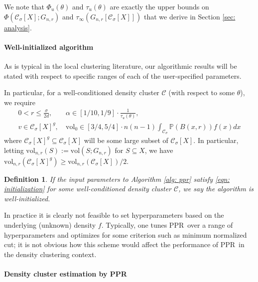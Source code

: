 \documentclass{article}
\newcommand{\vol}{\mathrm{vol}}
\newcommand{\1}{\mathbf{1}}
\newcommand{\Phibf}{\Phi_{u}}
\newcommand{\taubf}{\tau_{u}}
\newcommand{\Xbf}{X}             %
\newcommand{\Pbb}{\mathbb{P}}
\newcommand{\Cset}{\mathcal{C}}
\newcommand{\Csig}{\Cset_{\sigma}}
\newcommand{\ppr}{{\sc PPR}}
\newcommand{\pprspace}{{\sc PPR~}}
\theoremstyle{aldenthm}
\newtheorem{definition}{Definition}
\theoremstyle{aldenrmrk}
\begin{document}
We note that $\Phibf(\theta)$ and $\taubf(\theta)$ are exactly the upper bounds on $\Phi(\Csig[\Xbf]; G_{n,r})$ and $\tau_{\infty}(G_{n,r}[\Csig[\Xbf]])$ that we derive in Section \ref{sec: analysis}.

\paragraph{Well-initialized algorithm}

As is typical in the local clustering literature, our algorithmic results will be stated with respect to specific ranges of each of the user-specified parameters.

In particular, for a well-conditioned density cluster $\Cset$ (with respect to some $\theta$), we require
\begin{align}
\label{eqn: initialization}
0 < r \leq \frac{\sigma}{2d}, & ~\alpha \in [1/10, 1/9] \cdot \frac{1}{\taubf(\theta)} \nonumber,  \\
v \in \Csig[\Xbf]^g, & ~\vol_0 \in [3/4,5/4] \cdot n(n-1) \int_{\Csig} \Pbb(B(x,r)) f(x) dx
\end{align}
where $\Csig[\Xbf]^g \subseteq \Csig[\Xbf]$ will be some large subset of $\Csig[\Xbf]$. In particular, letting $\vol_{n,r}(S) := \vol(S; G_{n,r})$ for $S \subseteq \Xbf$, we have $\vol_{n,r}(\Csig[\Xbf]^g) \geq \vol_{n,r}(\Csig[\Xbf])/2$.

\begin{definition}
	If the input parameters to Algorithm \ref{alg: ppr} satisfy \eqref{eqn: initialization} for some well-conditioned density cluster $\Cset$, we say the algorithm is \emph{well-initialized}.
\end{definition}

In practice it is clearly not feasible to set hyperparameters based on the underlying (unknown) density $f$. Typically, one tunes \pprspace over a range of hyperparameters and optimizes for some criterion such as minimum normalized cut; it is not obvious how this scheme would affect the performance of \pprspace in the density clustering context.

\paragraph{Density cluster estimation by \ppr}
\end{document}

